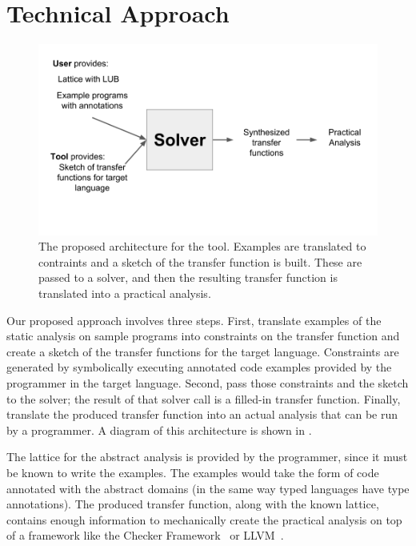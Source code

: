 \documentclass[10pt,conference]{IEEEtran}
\begin{document}
\section{Technical Approach}

\begin{figure}
 \includegraphics[width=\linewidth]{arch.png}
 \caption{The proposed architecture for the tool.
   Examples are translated to contraints and a sketch of the transfer function is built.
   These are passed to a solver, and then the resulting transfer function is translated into
 a practical analysis.}
\label{fig-arch}
\end{figure} 

Our proposed approach involves three steps.
First, translate examples of the static analysis on sample programs
into constraints on the transfer function and create
a sketch of the transfer functions for the target language.
Constraints are generated by symbolically executing annotated
code examples provided by the programmer in the target language.
Second, pass those constraints and the sketch to the solver;
the result of that solver call is a filled-in transfer
function. Finally, translate the produced transfer function
into an actual analysis that can be run by a programmer.
A diagram of this architecture is shown in .

The lattice for the abstract analysis is provided by
the programmer, since it must be known to write the examples.
The examples would take the form of code annotated with the
abstract domains (in the same way typed languages have type annotations).
The produced transfer function, along with the known lattice,
contains enough information to mechanically create the practical
analysis on top of a framework like the
Checker Framework~\cite{checker-framework} or LLVM~\cite{lattner04:_llvm}.
\end{document}
